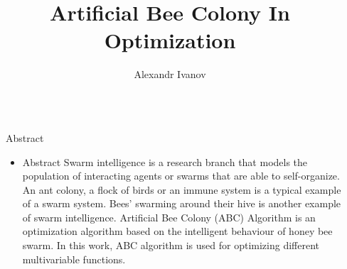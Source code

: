 \documentclass[final,hyperref]{beamer}
\title{\huge Artificial Bee Colony In Optimization} %
\author{Alexandr Ivanov} %
\institute{MIPT DCAM} %
\begin{document}

\begin{frame}[t] %

\begin{columns}[t] %

\begin{column}{.02\textwidth}\end{column} %

\begin{column}{.465\textwidth} %


\begin{block}{Abstract}

\begin{itemize}
	\item 
		Abstract Swarm intelligence is a research branch that models the population of
		interacting agents or swarms that are able to self-organize. An ant colony, a flock of
		birds or an immune system is a typical example of a swarm system. Bees’ swarming
		around their hive is another example of swarm intelligence. Artificial Bee Colony
		(ABC) Algorithm is an optimization algorithm based on the intelligent behaviour of
		honey bee swarm. In this work, ABC algorithm is used for optimizing different 
		multivariable functions.
\end{itemize}

\end{block}



\end{column}
\end{columns}
\end{frame}
\end{document}

